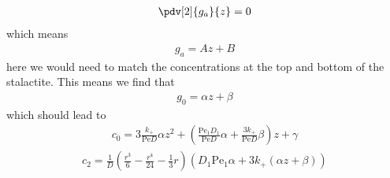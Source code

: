 \documentclass[12pt]{article}
\newcommand{\Pe}{\mathrm{Pe}}
\begin{document}
\begin{align}
\pdv[2]{g_a}{z} = 0 
\end{align}
which means
\begin{align}
g_a = A z +B
\end{align}
here we would need to match the concentrations at the top and bottom of the stalactite.
This means we find that \begin{align}
g_0 = \alpha z + \beta
\end{align}
which should lead to 
\begin{align}
c_0 = 3 \frac{k_+}{\Pe D}\alpha z^2+ \left(\frac{\Pe_1D_1}{\Pe D} \alpha + \frac{3k_+}{\Pe D}\beta\right)z +\gamma
\end{align}
\begin{align} 
c_2 = \frac{1}{D} \left(\frac{r^3}{6} - \frac{r^4}{24} -\frac{1}{3}r\right)\left(D_1\Pe_1\alpha+ 3k_+ (\alpha z +\beta)\right)
\end{align}
\end{document}

